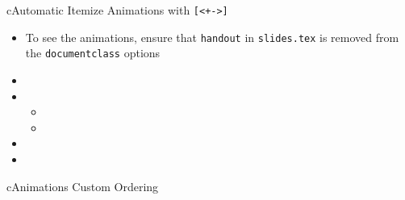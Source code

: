 \begin{myslide}{c}{Automatic Itemize Animations with \lstinline{[<+->]}}

\begin{itemize}[<+->]

\item To see the animations, ensure that \lstinline{handout} in \lstinline{slides.tex} is removed from the \lstinline{documentclass} options

\item \lipsum[1][1-2]

\item \lipsum[1][3]

\begin{itemize}

\item \lipsum[1][3]

\item \lipsum[1][4-5]

\end{itemize}

\item \lipsum[1][4-5]

\item \lipsum[1][6]

\end{itemize}

\end{myslide}

\begin{myslide}{c}{Animations Custom Ordering}

\begin{columns}

\begin{column}{0.65\textwidth}

\begin{itemize}





\end{itemize}

\end{column}


\end{columns}

\end{myslide}

